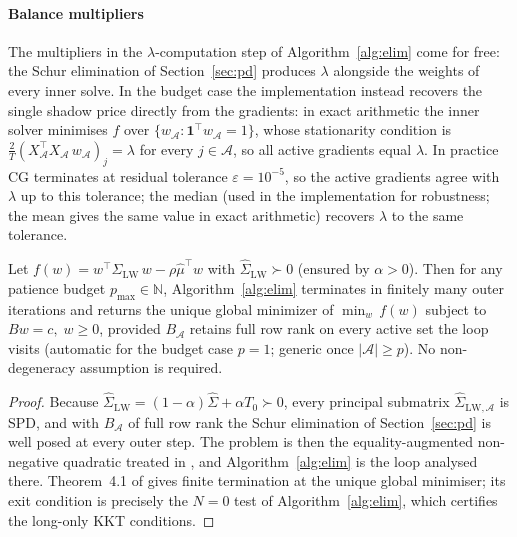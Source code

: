 \paragraph{Balance multipliers}
The multipliers in the $\lambda$-computation step of Algorithm~\ref{alg:elim} come for
free: the Schur elimination of Section~\ref{sec:pd} produces $\lambda$ alongside the
weights of every inner solve. In the budget case the implementation instead recovers
the single shadow price directly from the gradients: in exact arithmetic the inner
solver minimises $f$ over $\{w_\mathcal{A} : \mathbf{1}^\top w_\mathcal{A} = 1\}$, whose
stationarity condition is
$\tfrac{2}{T}(X_\mathcal{A}^\top X_\mathcal{A}\,w_\mathcal{A})_j = \lambda$
for every $j \in \mathcal{A}$, so all active gradients equal $\lambda$.
In practice CG terminates at residual tolerance $\varepsilon = 10^{-5}$, so
the active gradients agree with $\lambda$ up to this tolerance; the median (used in the implementation for robustness; the mean gives the
same value in exact arithmetic) recovers $\lambda$ to the same tolerance.

\begin{theorem}\label{thm:termination}
Let $f(w) = w^\top \hat\Sigma_{\mathrm{LW}}\,w - \rho\hat\mu^\top w$ with
$\hat\Sigma_{\mathrm{LW}} \succ 0$ (ensured by $\alpha > 0$).
Then for any patience budget $p_{\max} \in \mathbb{N}$, Algorithm~\ref{alg:elim}
terminates in finitely many outer iterations and returns the unique global minimizer
of $\min_{w}\,f(w)$ subject to $Bw = c,\;w \geq 0$, provided $B_{\mathcal{A}}$ retains
full row rank on every active set the loop visits (automatic for the budget case
$p = 1$; generic once $|\mathcal{A}| \geq p$).
No non-degeneracy assumption is required.
\end{theorem}

\begin{proof}
Because $\hat\Sigma_{\mathrm{LW}} = (1-\alpha)\hat\Sigma + \alpha T_0 \succ 0$, every
principal submatrix $\hat\Sigma_{\mathrm{LW},\mathcal{A}}$ is SPD, and with
$B_{\mathcal{A}}$ of full row rank the Schur elimination of Section~\ref{sec:pd} is
well posed at every outer step. The problem is then the equality-augmented
non-negative quadratic treated in \cite{schmelzer2026nncg}, and
Algorithm~\ref{alg:elim} is the loop analysed there. Theorem~4.1 of
\cite{schmelzer2026nncg} gives finite termination at the unique global minimiser; its
exit condition is precisely the $N = 0$ test of Algorithm~\ref{alg:elim}, which
certifies the long-only KKT conditions.
\end{proof}

